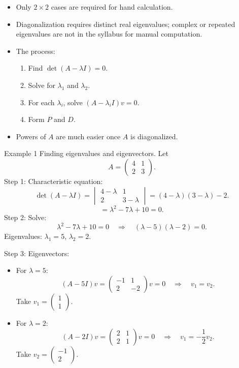 \documentclass[11pt]{article}
\def\textbf#1{#1}%
\def\mathbf#1{#1}%
\begin{document}
\begin{itemize}
  \item Only $2\times 2$ cases are required for hand calculation.
  \item Diagonalization requires distinct real eigenvalues; complex or repeated eigenvalues are not in the syllabus for manual computation.
  \item The process:
    \begin{enumerate}
      \item Find $\det(A - \lambda I) = 0$.
      \item Solve for $\lambda_1$ and $\lambda_2$.
      \item For each $\lambda_i$, solve $(A - \lambda_i I)\mathbf{v} = \mathbf{0}$.
      \item Form $P$ and $D$.
    \end{enumerate}
  \item Powers of $A$ are much easier once $A$ is diagonalized.
\end{itemize}


\textbf{Example 1}  
\textbf{Finding eigenvalues and eigenvectors.}  
Let
\[
A = \begin{pmatrix} 4 & 1 \\ 2 & 3 \end{pmatrix}.
\]
\textbf{Step 1:} Characteristic equation:
\[
\det(A - \lambda I) = 
\begin{vmatrix} 4-\lambda & 1 \\ 2 & 3-\lambda \end{vmatrix}
= (4-\lambda)(3-\lambda) - 2.
\]
\[
= \lambda^2 - 7\lambda + 10 = 0.
\]
\textbf{Step 2:} Solve:
\[
\lambda^2 - 7\lambda + 10 = 0
\quad\Rightarrow\quad (\lambda - 5)(\lambda - 2) = 0.
\]
Eigenvalues: $\lambda_1 = 5$, $\lambda_2 = 2$.

\textbf{Step 3:} Eigenvectors:
\begin{itemize}
  \item For $\lambda = 5$:
    \[
    (A - 5I)\mathbf{v} =
    \begin{pmatrix} -1 & 1 \\ 2 & -2 \end{pmatrix}\mathbf{v} = \mathbf{0}
    \quad\Rightarrow\quad v_1 = v_2.
    \]
    Take $\mathbf{v}_1 = \begin{pmatrix} 1 \\ 1 \end{pmatrix}$.

  \item For $\lambda = 2$:
    \[
    (A - 2I)\mathbf{v} =
    \begin{pmatrix} 2 & 1 \\ 2 & 1 \end{pmatrix}\mathbf{v} = \mathbf{0}
    \quad\Rightarrow\quad v_1 = -\frac{1}{2}v_2.
    \]
    Take $\mathbf{v}_2 = \begin{pmatrix} -1 \\ 2 \end{pmatrix}$.
\end{itemize}
\end{document}
